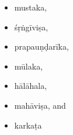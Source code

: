 \begin{translation}
\begin{itemize}
\item \gls{mustaka},
\item \gls{śṛṅgīviṣa},
\item \gls{prapauṇḍarīka},
\item \gls{mūlaka},
\item \gls{hālāhala},
\item \gls{mahāviṣa},
and 
\item \gls{karkaṭa}
            \end{itemize}



\end{translation}
